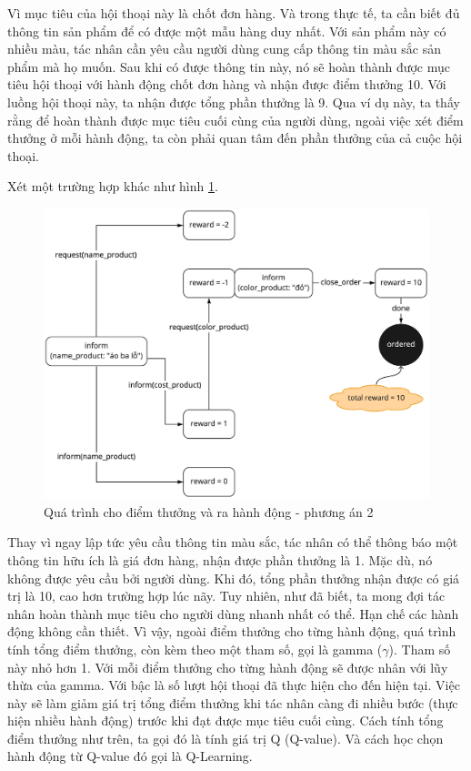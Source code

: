 Vì mục tiêu của hội thoại này là chốt đơn hàng. Và trong thực tế,
ta cần biết đủ thông tin sản phẩm để có được một mẫu hàng duy nhất.
Với sản phẩm này có nhiều màu, tác nhân cần yêu cầu người dùng
cung cấp thông tin màu sắc sản phẩm mà họ muốn. Sau khi có được
thông tin này, nó sẽ hoàn thành được mục tiêu hội thoại với hành động
chốt đơn hàng và nhận được điểm thưởng 10. Với luồng hội thoại này,
ta nhận được tổng phần thưởng là 9. Qua ví dụ này, ta thấy rằng để
hoàn thành được mục tiêu cuối cùng của người dùng, ngoài việc xét
điểm thưởng ở mỗi hành động, ta còn phải quan tâm đến phần thưởng
của cả cuộc hội thoại.

Xét một trường hợp khác như hình \ref{fig:dialog3}.

\begin{figure}[ht!]
    \centering
    \includegraphics[scale=0.18]{thesis/chatbot/kienthuc/img/dialog_ex15.jpg}
    \caption{Quá trình cho điểm thưởng và ra hành động - phương án 2}
    \label{fig:dialog3}
\end{figure}

Thay vì ngay lập tức yêu cầu thông tin màu sắc, tác nhân có thể
thông báo một thông tin hữu ích là giá đơn hàng, nhận được
phần thưởng là 1. Mặc dù, nó không được yêu cầu bởi người dùng.
Khi đó, tổng phần thưởng nhận được có giá trị là 10, cao hơn
trường hợp lúc nãy. Tuy nhiên, như đã biết, ta mong đợi tác nhân
hoàn thành mục tiêu cho người dùng nhanh nhất có thể. Hạn chế các
hành động không cần thiết. Vì vậy, ngoài điểm thưởng cho từng
hành động, quá trình tính tổng điểm thưởng, còn kèm theo một tham số,
gọi là gamma ($\gamma$). Tham số này nhỏ hơn 1. Với mỗi điểm thưởng
cho từng hành động sẽ được nhân với lũy thừa của gamma. Với bậc là
số lượt hội thoại đã thực hiện cho đến hiện tại. Việc này sẽ làm giảm
giá trị tổng điểm thưởng khi tác nhân càng đi nhiều bước (thực hiện
nhiều hành động) trước khi đạt được mục tiêu cuối cùng. Cách tính
tổng điểm thưởng như trên, ta gọi đó là tính giá trị Q (Q-value).
Và cách học chọn hành động từ Q-value đó gọi là Q-Learning.

